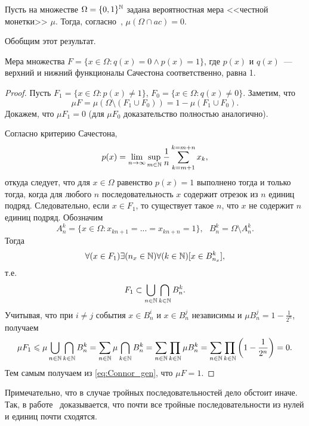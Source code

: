 Пусть на множестве $\Omega=\{0,1\}^{\mathbb{N}}$ задана вероятностная мера <<честной монетки>> $\mu$.
Тогда, согласно~\cite{connor1990almost}, $\mu(\Omega\cap ac)=0$.

Обобщим этот результат.
\begin{theorem}
	\label{thm:Connor_generalized}
	Мера множества $F=\{x\in\Omega : q(x) = 0 \wedge p(x)= 1\}$,
	где $p(x)$ и $q(x)$~--- верхний и нижний функционалы Сачестона соответственно,
	равна 1.
\end{theorem}

\begin{proof}
	Пусть $F_1=\{x\in\Omega : p(x) \neq 1\}$, $F_0=\{x\in\Omega : q(x) \neq 0\}$.
	Заметим, что
	\begin{equation}
		\label{eq:Connor_gen}
		\mu F = \mu (\Omega\setminus(F_1 \cup F_0)) = 1 - \mu (F_1 \cup F_0)
		.
	\end{equation}
	Докажем, что $\mu F_1 = 0 $	(для $\mu F_0$  доказательство полностью аналогично).

	Согласно критерию Сачестона,
	\begin{equation}
		p(x) = \lim_{n\to\infty} \sup_{m\in\mathbb{N}} \frac{1}{n} \sum_{k=m+1}^{k=m+n} x_k
		,
	\end{equation}
	откуда следует, что
	для $x\in\Omega$ равенство $p(x) = 1$ выполнено тогда и только тогда,
	когда для любого $n$ последовательность $x$ содержит отрезок из $n$ единиц подряд.
%
	Следовательно, если $x\in F_1$,
	то существует такое $n$,
	что $x$ не содержит $n$ единиц подряд.
%
%
	Обозначим
	\begin{equation}
		A_n^k = \{x\in\Omega : x_{kn+1} = ... = x_{kn+n} = 1\}
		,
		~~~
		B_n^k = \Omega \setminus A_n^k
		.
	\end{equation}
	Тогда
	\begin{equation}
		\forall(x\in F_1)\exists(n_x\in\mathbb{N})\forall(k\in\mathbb{N})[x\in B_{n_x}^k]
		,
	\end{equation}
	т.е.
	\begin{equation}
		F_1 \subset \bigcup_{n\in\mathbb{N}} \bigcap_{k\in\mathbb{N}} B_{n}^k
		.
	\end{equation}
	Учитывая, что при $i\neq j$ события $x\in B_n^i$ и $x\in B_n^j$ независимы и $\mu B_n^j = 1-\frac{1}{2^n}$,
	получаем
	\begin{multline}
		\mu F_1 \leqslant \mu \bigcup_{n\in\mathbb{N}} \bigcap_{k\in\mathbb{N}} B_{n}^k
		=
		\sum_{n\in\mathbb{N}} \mu \bigcap_{k\in\mathbb{N}} B_{n}^k
		=
		\sum_{n\in\mathbb{N}}  \prod_{k\in\mathbb{N}} \mu B_{n}^k
		=
		\sum_{n\in\mathbb{N}}  \prod_{k\in\mathbb{N}} \left( 1-\frac{1}{2^n} \right)
		=0
		.
	\end{multline}
	Тем самым получаем из \eqref{eq:Connor_gen}, что $\mu F = 1$.
\end{proof}

\begin{remark}
	Примечательно, что в случае тройных последовательностей дело обстоит иначе.
	Так, в работе~\cite{esi2014almost} доказывается, что почти все тройные последовательности из нулей и единиц почти сходятся.
\end{remark}
